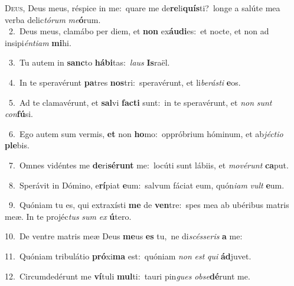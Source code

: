 \lettrine{\initial\textcolor{\initialcolor}{D}}{eus,} Deus meus, réspice in me:~\dagger quare me de\-\textbf{re}\-li\-\textbf{quís}\-ti?~\star longe a salúte mea verba delic\-\textit{tó}\-\textit{rum} \textit{me}\-\textbf{ó}rum.\\
{\numbfont\textcolor{\numbcolor}{~2.}}~Deus meus, clamábo per diem, et \textbf{non} ex\-\textbf{áu}\-\textbf{di}es:~\star et nocte, et non ad insipi\-\textit{én}\-\textit{ti}\textit{am} \textbf{mi}\-hi.\par
{\numbfont\textcolor{\numbcolor}{~3.}}~Tu autem in \textbf{sanc}\-to \textbf{há}\-\textbf{bi}tas:~\star \textit{laus} \textbf{Is}\-raël.\par
{\numbfont\textcolor{\numbcolor}{~4.}}~In te speravérunt \textbf{pa}\-tres \textbf{nos}\-tri:~\star speravérunt, et li\-\textit{be}\-\textit{rás}\textit{ti} \textbf{e}\-os.\par
{\numbfont\textcolor{\numbcolor}{~5.}}~Ad te clamavérunt, et \textbf{sal}\-vi \textbf{fac}\-\textbf{ti} sunt:~\star in te speravérunt, et \textit{non} \textit{sunt} \textit{con}\-\textbf{fú}si.\par
{\numbfont\textcolor{\numbcolor}{~6.}}~Ego autem sum vermis, \textbf{et} non \textbf{ho}\-mo:~\star oppróbrium hóminum, et ab\-\textit{jéc}\-\textit{ti}\textit{o} \textbf{ple}\-bis.\par
{\numbfont\textcolor{\numbcolor}{~7.}}~Omnes vidéntes me \textbf{de}\-ri\-\textbf{sé}\-\textbf{runt} me:~\star locúti sunt lábiis, et \textit{mo}\-\textit{vé}\textit{runt} \textbf{ca}\-put.\par
{\numbfont\textcolor{\numbcolor}{~8.}}~Sperávit in Dómino, e\-\textbf{rí}\-piat \textbf{e}\-um:~\star salvum fáciat eum, quón\-\textit{i}\-\textit{am} \textit{vult} \textbf{e}\-um.\par
{\numbfont\textcolor{\numbcolor}{~9.}}~Quóniam tu es, qui extraxísti \textbf{me} de \textbf{ven}\-tre:~\star spes mea ab ubéribus matris meæ. In te projéc\textit{tus} \textit{sum} \textit{ex} \textbf{ú}\-tero.\par
{\numbfont\textcolor{\numbcolor}{10.}}~De ventre matris meæ Deus \textbf{me}\-us \textbf{es} tu,~\star ne di\-\textit{scés}\-\textit{se}\textit{ris} \textbf{a} me:\par
{\numbfont\textcolor{\numbcolor}{11.}}~Quóniam tribulátio \textbf{pró}\-xi\textbf{ma} est:~\star quóniam \textit{non} \textit{est} \textit{qui} \textbf{ád}\-juvet.\par
{\numbfont\textcolor{\numbcolor}{12.}}~Circumdedérunt me \textbf{ví}\-tuli \textbf{mul}\-ti:~\star tauri pin\textit{gues} \textit{ob}\-\textit{se}\textbf{dé}runt me.\par
